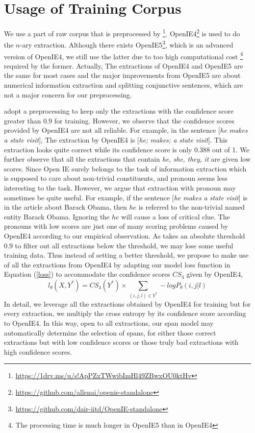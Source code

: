 \documentclass[letterpaper]{article} %
\begin{document}
\section{Usage of Training Corpus}
We use a part of raw corpus that is preprocessed by \cite{Cui2018NeuralOI}\footnote{\url{https://1drv.ms/u/s!ApPZxTWwibImHl49ZBwxOU0ktHv}}. OpenIE4\footnote{\url{https://github.com/allenai/openie-standalone}} is used to do the $n$-ary extraction. Although there exists OpenIE5\footnote{\url{https://github.com/dair-iitd/OpenIE-standalone}}, which is an advanced version of OpenIE4, we still use the latter due to too high computational cost \footnote{The processing time is much longer in OpenIE5 than in OpenIE4} required by the former. Actually, The extractions of OpenIE4 and OpenIE5 are the same for most cases and the major improvements from OpenIE5 are about numerical information extraction and splitting conjunctive sentences, which are not a major concern for our preprocessing. 

\cite{Cui2018NeuralOI} adopt a preprocessing to keep only the extractions with the confidence score greater than 0.9 for training. However, we observe that the confidence scores provided by OpenIE4 are not all reliable. For example, in the sentence [\emph{he makes a state visit}], The extraction by OpenIE4 is [\emph{he; makes; a state visit}]. This extraction looks quite correct while its confidence score is only 0.388 out of 1. We further observe that all the extractions that contain \emph{he, she, they, it} are given low scores. Since Open IE surely belongs to the task of information extraction which is supposed to care about non-trivial constituents, and pronoun seems less interesting to the task. However, we argue that extraction with pronoun may sometimes be quite useful. For example, if the sentence [\emph{he makes a state visit}] is in the article about Barack Obama, then $he$ is referred to the non-trivial named entity Barack Obama. Ignoring the $he$ will cause a loss of critical clue. The pronouns with low scores are just one of many scoring problems caused by OpenIE4 according to our empirical observation. As \cite{Cui2018NeuralOI} takes an absolute threshold 0.9 to filter out all extractions below the threshold, we may lose some useful training data. Thus instead of setting a better threshold, we propose to make use of all the extractions from OpenIE4 by adapting our model loss function in Equation (\ref{loss}) to accommodate the confidence scores $CS_4$ given by OpenIE4, 
\begin{equation}
        l_\theta(X,Y^*)=CS_4(Y^*)\times 
        \sum_{(i,j,l)\in Y^*} -log P_{\theta}(i,j|l)
\end{equation}
In detail, we leverage all the extractions obtained by OpenIE4 for training but for every extraction, we multiply the cross entropy by its confidence score according to OpenIE4. In this way, open to all extractions, our span model may automatically determine the selection of spans, for either those correct extractions but with low confidence scores or those truly bad extractions with high confidence scores. 
\end{document}
